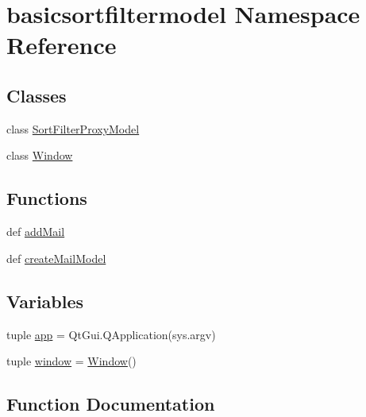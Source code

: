 \hypertarget{namespacebasicsortfiltermodel}{}\section{basicsortfiltermodel Namespace Reference}
\label{namespacebasicsortfiltermodel}
\subsection*{Classes}
\begin{DoxyCompactItemize}
\item 
class \hyperlink{classbasicsortfiltermodel_1_1SortFilterProxyModel}{Sort\+Filter\+Proxy\+Model}
\item 
class \hyperlink{classbasicsortfiltermodel_1_1Window}{Window}
\end{DoxyCompactItemize}
\subsection*{Functions}
\begin{DoxyCompactItemize}
\item 
def \hyperlink{namespacebasicsortfiltermodel_a881e3d201e4e0aa5f3aaa3e30dd46d89}{add\+Mail}
\item 
def \hyperlink{namespacebasicsortfiltermodel_a29ce7ba7417f0073c8118edc1a625565}{create\+Mail\+Model}
\end{DoxyCompactItemize}
\subsection*{Variables}
\begin{DoxyCompactItemize}
\item 
tuple \hyperlink{namespacebasicsortfiltermodel_afe990b7008644a0011e566457aa331b6}{app} = Qt\+Gui.\+Q\+Application(sys.\+argv)
\item 
tuple \hyperlink{namespacebasicsortfiltermodel_a668d232a3d1354861c1a3afd1c055c0f}{window} = \hyperlink{classbasicsortfiltermodel_1_1Window}{Window}()
\end{DoxyCompactItemize}


\subsection{Function Documentation}
\hypertarget{namespacebasicsortfiltermodel_a881e3d201e4e0aa5f3aaa3e30dd46d89}{}
